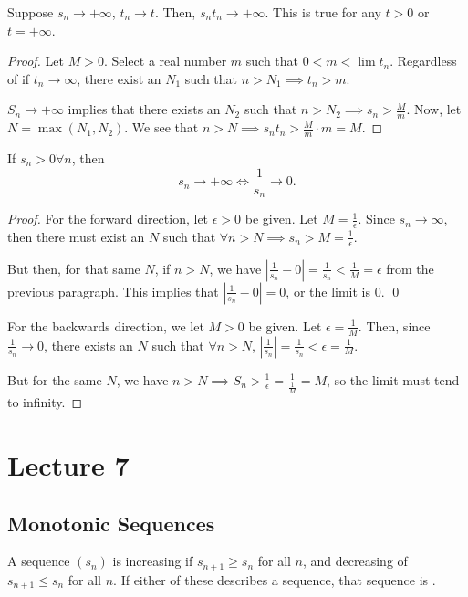 \documentclass{book}
\begin{document}
\begin{thm}
    Suppose $s_n \to +\infty$, $t_n \to t$. Then, $s_nt_n \to +\infty$. This is true for any $t > 0$ or $t = +\infty$.
\end{thm}

\begin{proof}
    Let $M > 0$. Select a real number $m$ such that $0 < m < \lim t_n$. Regardless of if $t_n \to \infty$, there exist an $N_1$ such that $n > N_1 \implies t_n > m$.

    $S_n \to +\infty$ implies that there exists an $N_2$ such that $n > N_2 \implies s_n > \frac{M}{m}$. Now, let $N = \max(N_1, N_2)$. We see that $n > N \implies s_nt_n > \frac{M}{m} \cdot m = M$.
\end{proof}

\begin{thm}[Duality]
    If $s_n > 0 \forall n$, then \[s_n \to +\infty \iff \frac{1}{s_n} \to 0.\]
\end{thm}
\begin{proof}
    For the forward direction, let $\epsilon > 0$ be given. Let $M = \frac{1}{\epsilon}$. Since $s_n \to \infty$, then there must exist an $N$ such that $\forall n > N \implies s_n > M = \frac{1}{\epsilon}$. 

    But then, for that same $N$, if $n > N$, we have $|\frac{1}{s_n} - 0| = \frac{1}{s_n} < \frac{1}{M} = \epsilon$ from the previous paragraph. This implies that $|\frac{1}{s_n} - 0| = 0$, or the limit is $0$. \qed

    For the backwards direction, we let $M > 0$ be given. Let $\epsilon = \frac{1}{M}$. Then, since $\frac{1}{s_n} \to 0$, there exists an $N$ such that $\forall n > N$, $|\frac{1}{s_n}| = \frac{1}{s_n} < \epsilon = \frac{1}{M}$.

    But for the same $N$, we have $n > N \implies S_n > \frac{1}{\epsilon} = \frac{1}{\frac{1}{M}} = M$, so the limit must tend to infinity.
\end{proof}

\section{Lecture 7}
\subsection{Monotonic Sequences}
\begin{defn}[Monotonicity]
    A sequence $(s_n)$ is increasing if $s_{n + 1} \geq s_n$ for all $n$, and decreasing of $s_{n + 1} \leq s_n$ for all $n$. If either of these describes a sequence, that sequence is .
\end{defn}
\end{document}
